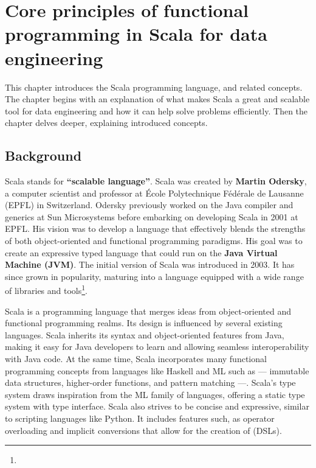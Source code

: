 \chapter{ Core principles of functional programming in Scala for data engineering }

This chapter introduces the Scala programming language, and related concepts. The chapter begins with an explanation of what makes Scala a great and scalable tool for data engineering and how it can help solve problems efficiently. Then the chapter delves deeper, explaining introduced concepts.

\section{Background}

Scala stands for \textbf{“scalable language”}. Scala was created by \textbf{Martin Odersky}, a computer scientist and professor at École Polytechnique Fédérale de Lausanne (EPFL) in Switzerland. Odersky previously worked on the Java compiler and generics at Sun Microsystems before embarking on developing Scala in 2001 at EPFL. His vision was to develop a language that effectively blends the strengths of both object-oriented and functional programming paradigms.  His goal was to create an expressive typed language that could run on the \textbf{Java Virtual Machine (JVM)}. The initial version of Scala was introduced in 2003. It has since grown in popularity, maturing into a language equipped with a wide range of libraries and tools\footnote[1]{}.

Scala is a programming language that merges ideas from object-oriented and functional programming realms. Its design is influenced by several existing languages. Scala inherits its syntax and object-oriented features from Java, making it easy for Java developers to learn and allowing seamless interoperability with Java code. At the same time, Scala incorporates many functional programming concepts from languages like Haskell and ML such as — immutable data structures, higher-order functions, and pattern matching —. Scala's type system draws inspiration from the ML family of languages, offering a static type system with type interface. Scala also strives to be concise and expressive, similar to scripting languages like Python. It includes features such, as operator overloading and implicit conversions that allow for the creation of (DSLs)\footnotemark[2].

